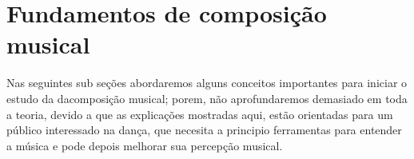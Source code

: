 
\chapter{Fundamentos de composição musical}
\label{cap:musicacomposer}
Nas seguintes sub seções abordaremos alguns conceitos importantes para iniciar o estudo da dacomposição musical;
porem, não aprofundaremos demasiado em toda a teoria, 
devido a que as explicações mostradas aqui, estão
orientadas para um público interessado na dança, que necesita a principio
ferramentas para entender a música e pode depois melhorar sua percepção musical. 


 
 
 


 



 

 

  
% 

  


